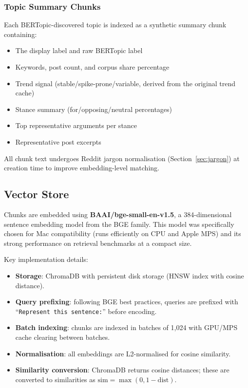 \documentclass[11pt,a4paper]{article}
\begin{document}
\subsubsection{Topic Summary Chunks}

Each BERTopic-discovered topic is indexed as a synthetic summary chunk containing:
\begin{itemize}[leftmargin=*]
  \item The display label and raw BERTopic label
  \item Keywords, post count, and corpus share percentage
  \item Trend signal (stable/spike-prone/variable, derived from the original trend cache)
  \item Stance summary (for/opposing/neutral percentages)
  \item Top representative arguments per stance
  \item Representative post excerpts
\end{itemize}

All chunk text undergoes Reddit jargon normalisation (Section~\ref{sec:jargon}) at creation time to improve embedding-level matching.


\subsection{Vector Store}
\label{sec:vectorstore}

Chunks are embedded using \textbf{BAAI/bge-small-en-v1.5}, a 384-dimensional sentence embedding model from the BGE family. This model was specifically chosen for Mac compatibility (runs efficiently on CPU and Apple MPS) and its strong performance on retrieval benchmarks at a compact size.

Key implementation details:
\begin{itemize}[leftmargin=*]
  \item \textbf{Storage}: ChromaDB with persistent disk storage (HNSW index with cosine distance).
  \item \textbf{Query prefixing}: following BGE best practices, queries are prefixed with ``\texttt{Represent this sentence:}'' before encoding.
  \item \textbf{Batch indexing}: chunks are indexed in batches of 1,024 with GPU/MPS cache clearing between batches.
  \item \textbf{Normalisation}: all embeddings are L2-normalised for cosine similarity.
  \item \textbf{Similarity conversion}: ChromaDB returns cosine distances; these are converted to similarities as $\text{sim} = \max(0, 1 - \text{dist})$.
\end{itemize}
\end{document}
